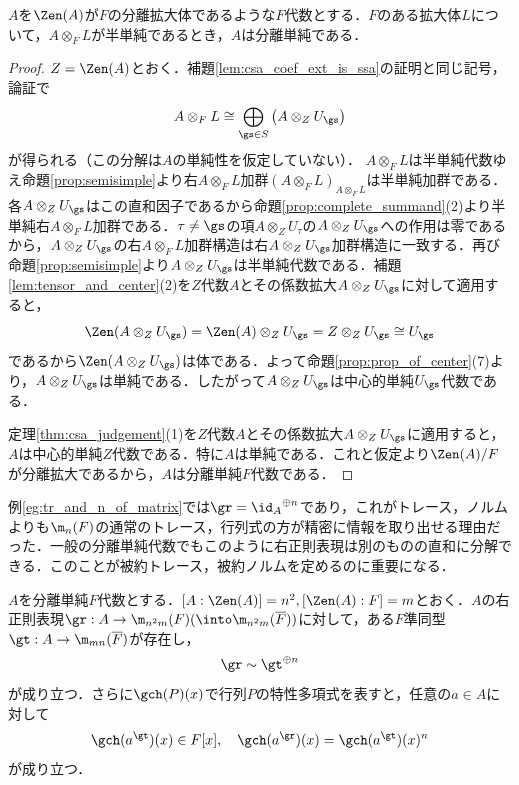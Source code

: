 \documentclass[a4paper,11pt]{jsarticle}
\begin{document}
\begin{lem}[中心が分離拡大で係数拡大してSSAなら分離SA]
  $A$を$\Zen(A)$が$F$の分離拡大体であるような$F$代数とする．$F$のある拡大体$L$について，$A\otimes_F L$が半単純であるとき，$A$は分離単純である．
\end{lem}
\begin{proof}
  $Z=\Zen(A)$とおく．補題\ref{lem:csa_coef_ext_is_ssa}の証明と同じ記号，論証で
  \[
    A\otimes_F L\cong \bigoplus_{\gs\in S}\left(A\otimes_Z U_{\gs}\right)
  \]
  が得られる（この分解は$A$の単純性を仮定していない）．
  $A\otimes_F L$は半単純代数ゆえ命題\ref{prop:semisimple}より右${A\otimes_F L}$加群$(A\otimes_F L)_{A\otimes_F L}$は半単純加群である．各$A\otimes_Z U_\gs$はこの直和因子であるから命題\ref{prop:complete_summand}(2)より半単純右$A\otimes_F L$加群である．$\tau\neq\gs$の項$A\otimes_Z U_\tau$の$A\otimes_Z U_\gs$への作用は零であるから，$A\otimes_Z U_\gs$の右$A\otimes_F L$加群構造は右$A\otimes_Z U_\gs$加群構造に一致する．再び命題\ref{prop:semisimple}より$A\otimes_Z U_\gs$は半単純代数である．補題\ref{lem:tensor_and_center}(2)を$Z$代数$A$とその係数拡大$A\otimes_Z U_\gs$に対して適用すると，
  \[
    \Zen(A\otimes_Z U_{\gs})=\Zen(A)\otimes_Z U_{\gs}=Z\otimes_Z U_{\gs}\cong U_{\gs}
  \]
  であるから$\Zen(A\otimes_Z U_{\gs})$は体である．よって命題\ref{prop:prop_of_center}(7)より，$A\otimes_Z U_\gs$は単純である．したがって$A\otimes_Z U_\gs$は中心的単純$U_\gs$代数である．

  定理\ref{thm:csa_judgement}(1)を$Z$代数$A$とその係数拡大$A\otimes_Z U_\gs$に適用すると，$A$は中心的単純$Z$代数である．特に$A$は単純である．これと仮定より$\Zen(A)/F$が分離拡大であるから，$A$は分離単純$F$代数である．
\end{proof}
例\ref{eg:tr_and_n_of_matrix}では$\gr={\id_A}^{\oplus n}$であり，これがトレース，ノルムよりも$\m_n(F)$の通常のトレース，行列式の方が精密に情報を取り出せる理由だった．一般の分離単純代数でもこのように右正則表現は別のものの直和に分解できる．このことが被約トレース，被約ノルムを定めるのに重要になる．
\begin{thm}[分離SAの正則表現の分解]\label{thm:sep_sa_reg_rep_decomp}
  $A$を分離単純$F$代数とする．$[A:\Zen(A)]=n^2, [\Zen(A):F]=m$とおく．$A$の右正則表現$\gr:A\to\m_{n^2m}(F)(\into\m_{n^2m}(\overline{F}))$に対して，ある$F$準同型$\gt:A\to\m_{mn}(\overline{F})$が存在し，
  \[
    \gr\sim\gt^{\oplus n}
  \]
  が成り立つ．さらに$\gch(P)(x)$で行列$P$の特性多項式を表すと，任意の$a\in A$に対して
  \[
    \gch(a^\gt)(x)\in F[x],\quad\gch(a^\gr)(x)=\gch(a^\gt)(x)^n
  \]
  が成り立つ．
\end{thm}
\end{document}

